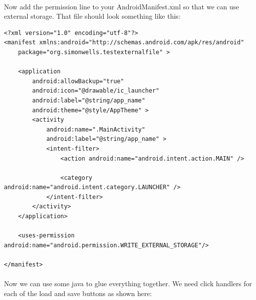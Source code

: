 \paragraph{} Now add the permission line to your AndroidManifest.xml so that we can use external storage. That file should look something like this:

\begin{lstlisting}
<?xml version="1.0" encoding="utf-8"?>
<manifest xmlns:android="http://schemas.android.com/apk/res/android"
    package="org.simonwells.testexternalfile" >

    <application
        android:allowBackup="true"
        android:icon="@drawable/ic_launcher"
        android:label="@string/app_name"
        android:theme="@style/AppTheme" >
        <activity
            android:name=".MainActivity"
            android:label="@string/app_name" >
            <intent-filter>
                <action android:name="android.intent.action.MAIN" />

                <category android:name="android.intent.category.LAUNCHER" />
            </intent-filter>
        </activity>
    </application>

    <uses-permission android:name="android.permission.WRITE_EXTERNAL_STORAGE"/>

</manifest>

\end{lstlisting}

\paragraph{} Now we can use some java to glue everything together. We need click handlers for each of the load and save buttons as shown here:

